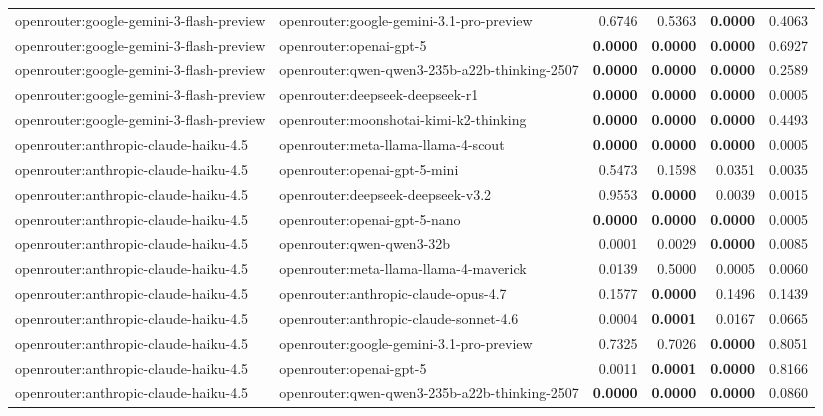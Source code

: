 \begin{table}[t]
\begin{tabular}{llrrrr}
openrouter:google-gemini-3-flash-preview & openrouter:google-gemini-3.1-pro-preview & 0.6746 & 0.5363 & \textbf{0.0000} & 0.4063 \\
openrouter:google-gemini-3-flash-preview & openrouter:openai-gpt-5 & \textbf{0.0000} & \textbf{0.0000} & \textbf{0.0000} & 0.6927 \\
openrouter:google-gemini-3-flash-preview & openrouter:qwen-qwen3-235b-a22b-thinking-2507 & \textbf{0.0000} & \textbf{0.0000} & \textbf{0.0000} & 0.2589 \\
openrouter:google-gemini-3-flash-preview & openrouter:deepseek-deepseek-r1 & \textbf{0.0000} & \textbf{0.0000} & \textbf{0.0000} & 0.0005 \\
openrouter:google-gemini-3-flash-preview & openrouter:moonshotai-kimi-k2-thinking & \textbf{0.0000} & \textbf{0.0000} & \textbf{0.0000} & 0.4493 \\
openrouter:anthropic-claude-haiku-4.5 & openrouter:meta-llama-llama-4-scout & \textbf{0.0000} & \textbf{0.0000} & \textbf{0.0000} & 0.0005 \\
openrouter:anthropic-claude-haiku-4.5 & openrouter:openai-gpt-5-mini & 0.5473 & 0.1598 & 0.0351 & 0.0035 \\
openrouter:anthropic-claude-haiku-4.5 & openrouter:deepseek-deepseek-v3.2 & 0.9553 & \textbf{0.0000} & 0.0039 & 0.0015 \\
openrouter:anthropic-claude-haiku-4.5 & openrouter:openai-gpt-5-nano & \textbf{0.0000} & \textbf{0.0000} & \textbf{0.0000} & 0.0005 \\
openrouter:anthropic-claude-haiku-4.5 & openrouter:qwen-qwen3-32b & 0.0001 & 0.0029 & \textbf{0.0000} & 0.0085 \\
openrouter:anthropic-claude-haiku-4.5 & openrouter:meta-llama-llama-4-maverick & 0.0139 & 0.5000 & 0.0005 & 0.0060 \\
openrouter:anthropic-claude-haiku-4.5 & openrouter:anthropic-claude-opus-4.7 & 0.1577 & \textbf{0.0000} & 0.1496 & 0.1439 \\
openrouter:anthropic-claude-haiku-4.5 & openrouter:anthropic-claude-sonnet-4.6 & 0.0004 & \textbf{0.0001} & 0.0167 & 0.0665 \\
openrouter:anthropic-claude-haiku-4.5 & openrouter:google-gemini-3.1-pro-preview & 0.7325 & 0.7026 & \textbf{0.0000} & 0.8051 \\
openrouter:anthropic-claude-haiku-4.5 & openrouter:openai-gpt-5 & 0.0011 & \textbf{0.0001} & \textbf{0.0000} & 0.8166 \\
openrouter:anthropic-claude-haiku-4.5 & openrouter:qwen-qwen3-235b-a22b-thinking-2507 & \textbf{0.0000} & \textbf{0.0000} & \textbf{0.0000} & 0.0860 \\

\end{tabular}
\end{table}
